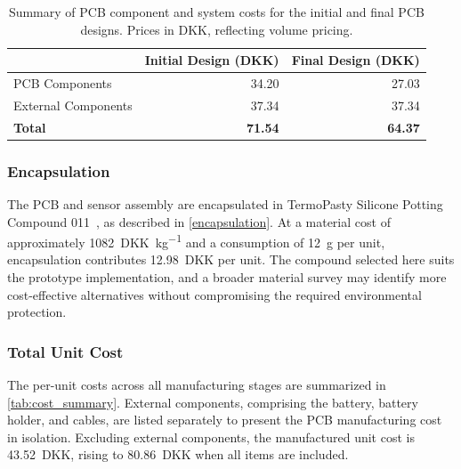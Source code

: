 \begin{table}[!htbp]
\centering
\caption{Summary of PCB component and system costs for the initial and final
         PCB designs. Prices in DKK, reflecting volume pricing.}
\label{tab:bom_summary}
\small
\setlength{\tabcolsep}{4pt}
\begin{tabularx}{\textwidth}{@{} X r r @{}}
\toprule
 & Initial Design (DKK) & Final Design (DKK) \\
\midrule
PCB Components      & 34.20 & 27.03 \\
External Components & 37.34 & 37.34 \\
\midrule
\textbf{Total}      & \textbf{71.54} & \textbf{64.37} \\
\bottomrule
\end{tabularx}
\end{table}
 
\subsubsection*{Encapsulation}
 
The PCB and sensor assembly are encapsulated in TermoPasty Silicone Potting Compound 011~\cite{termopasty_silicone_compound_011}, as described in \cref{encapsulation}. At a material cost of approximately \SI{1082}{DKK\per\kilo\gram} and a consumption of \SI{12}{\gram} per unit, encapsulation contributes \SI{12.98}{DKK} per unit. The compound selected here suits the prototype implementation, and a broader material survey may identify more cost-effective alternatives without compromising the required environmental protection.
 
\subsubsection*{Total Unit Cost}
 
The per-unit costs across all manufacturing stages are summarized in \cref{tab:cost_summary}. External components, comprising the battery, battery holder, and cables, are listed separately to present the PCB manufacturing cost in isolation. Excluding external components, the manufactured unit cost is \SI{43.52}{DKK}, rising to \SI{80.86}{DKK} when all items are included.
 
